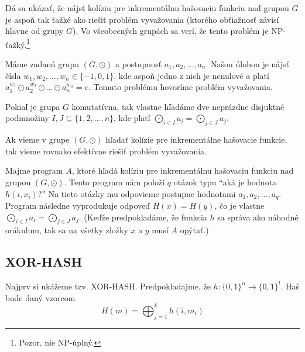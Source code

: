 Dá sa ukázať, že nájsť kolíziu pre inkrementálnu hašovaciu
funkciu nad grupou $G$ je aspoň tak ťažké ako riešiť
problém vyvažovania (ktorého obťiažnosť závisí hlavne od grupy 
$G$). Vo všeobecných grupách sa verí, že tento problém je
NP-ťažký.\footnote{Pozor, nie NP-úplný.}

\begin{definicia}
    Máme zadanú grupu $(G, \odot)$ a postupnosť $a_1, a_2, \dots, a_n$.
    Našou úlohou je nájsť čísla $w_1, w_2, \dots, w_n \in \{-1, 0, 1\}$,
    kde aspoň jedno z nich je nenulové a platí 
    $a_1^{w_1} \odot a_2^{w_2} \odot \dots \odot a_n^{w_n} = e$.
    Tomuto problému hovoríme problém vyvažovania.
\end{definicia}

\begin{poznamka}
    Pokiaľ je grupa $G$ komutatívna, tak vlastne hľadáme
    dve neprázdne disjuktné podmnožiny
    $I, J \subseteq \{1, 2, \dots, n\}$, kde platí 
    $\bigodot_{i\in I} a_i = \bigodot_{j \in J} a_j$.
\end{poznamka}

\begin{lema}
    Ak vieme v grupe $(G, \odot)$ hľadať kolízie pre inkrementálne hašovacie
    funkcie, tak vieme rovnako efektívne riešiť problém vyvažovania.
\end{lema}

\begin{dokaz}
    Majme program $A$, ktoré hľadá kolíziu pre inkrementálnu hašovaciu
    funkciu nad grupou $(G, \odot)$. Tento program nám položí $q$ otázok
    typu ``aká je hodnota $h(i, x_i)$?'' Na tieto otázky mu odpovieme postupne
    hodnotami $a_1, a_2, \dots, a_q$.
    Program následne vyprodukuje odpoveď $H(x) = H(y)$, čo je vlastne 
    $\bigodot_{i \in I} a_i = \bigodot_{j \in J} a_j$.
    (Keďže predpokladáme, že funkcia $h$ sa správa ako náhodné orákulum,
    tak sa na všetky zložky $x$ a $y$ musí $A$ opýtať.)
\end{dokaz}

\subsection{XOR-HASH}

Najprv si ukážeme tzv. XOR-HASH.
Predpokladajme, že $h\colon \{0,1\}^n \to \{0,1\}^l$.
Haš bude daný vzorcom
\begin{equation*}
    H(m) = \bigoplus_{j=1}^k h(i, m_i)
\end{equation*}

